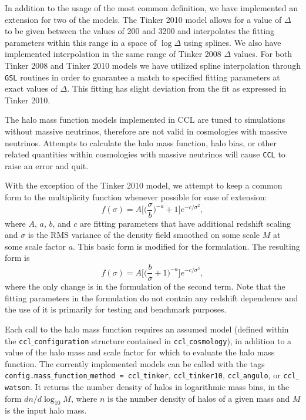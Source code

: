 \documentclass[\docopts]{\docclass}
\newcommand{\ccl}{{\tt CCL}\xspace}
\begin{document}
In addition to the usage of the most common definition, we have implemented an extension for two of the models. The Tinker 2010 model allows for a value of $\Delta$ to be given between the values of 200 and 3200 and interpolates the fitting parameters within this range in a space of $\log \Delta$ using splines. We also have implemented interpolation in the same range of Tinker 2008 $\Delta$ values. For both Tinker 2008 and Tinker 2010 models we have utilized spline interpolation through {\tt GSL} routines in order to guarantee a match to specified fitting parameters at exact values of $\Delta$. This fitting has slight deviation from the fit as expressed in Tinker 2010.

The halo mass function models implemented in CCL are tuned to simulations without massive neutrinos, therefore are not valid in cosmologies with massive neutrinos. Attempts to calculate the halo mass function, halo bias, or other related quantities within cosmologies with massive neutrinos will cause \ccl to raise an error and quit.


With the exception of the Tinker 2010 model, we attempt to keep a common form to the multiplicity function whenever possible for ease of extension:
\begin{equation}
f(\sigma)=A\Big[\Big(\frac{\sigma}{b}\Big)^{-a}+1\Big]e^{-c/{\sigma}^2},
\end{equation}
where $A$, $a$, $b$, and $c$ are fitting parameters that have additional redshift scaling and $\sigma$ is the RMS variance of the density field smoothed on some scale $M$ at some scale factor $a$. This basic form is modified for the \citet{Angulo2012} formulation. The resulting form is
\begin{equation}
f(\sigma)=A\Big[\Big(\frac{b}{\sigma}+1\Big)^{-a}\Big]e^{-c/{\sigma}^2},
\end{equation}
where the only change is in the formulation of the second term. Note that the fitting parameters in the \citet{Angulo2012} formulation do not contain any redshift dependence and the use of it is primarily for testing and benchmark purposes.

Each call to the halo mass function requires an assumed model (defined within the {\tt ccl$\_$configuration} structure contained in {\tt ccl$\_$cosmology}), in addition to a value of the halo mass and scale factor for which to evaluate the halo mass function. The currently implemented models can be called with the tags {\tt config.mass$\_$function$\_$method = ccl$\_$tinker}, {\tt ccl$\_$tinker10}, {\tt ccl$\_$angulo}, or {\tt ccl$\_$watson}. It returns the number density of halos in logarithmic mass bins, in the form $dn/d\log_{10}{M}$, where $n$ is the number density of halos of a given mass and $M$ is the input halo mass.
\end{document}
